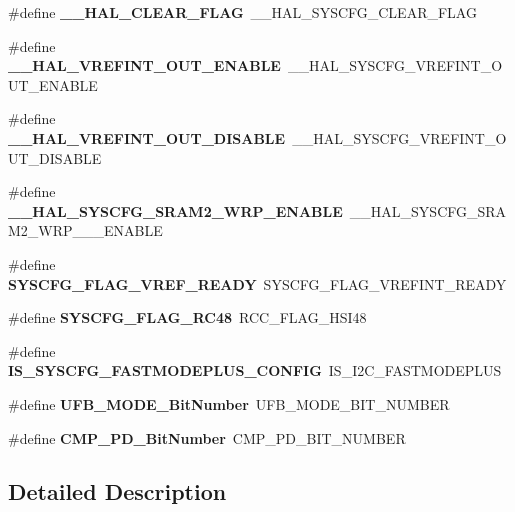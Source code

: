 \begin{DoxyCompactItemize}
\#define {\bfseries \+\_\+\+\_\+\+H\+A\+L\+\_\+\+C\+L\+E\+A\+R\+\_\+\+F\+L\+AG}~\+\_\+\+\_\+\+H\+A\+L\+\_\+\+S\+Y\+S\+C\+F\+G\+\_\+\+C\+L\+E\+A\+R\+\_\+\+F\+L\+AG
\item 
\mbox{\label{group___h_a_l___aliased___macros_gac1dfd2bab2879b5106f1dc496e3c356c}} 
\#define {\bfseries \+\_\+\+\_\+\+H\+A\+L\+\_\+\+V\+R\+E\+F\+I\+N\+T\+\_\+\+O\+U\+T\+\_\+\+E\+N\+A\+B\+LE}~\+\_\+\+\_\+\+H\+A\+L\+\_\+\+S\+Y\+S\+C\+F\+G\+\_\+\+V\+R\+E\+F\+I\+N\+T\+\_\+\+O\+U\+T\+\_\+\+E\+N\+A\+B\+LE
\item 
\mbox{\label{group___h_a_l___aliased___macros_ga8ef2904e9bea234864ed664771aeed49}} 
\#define {\bfseries \+\_\+\+\_\+\+H\+A\+L\+\_\+\+V\+R\+E\+F\+I\+N\+T\+\_\+\+O\+U\+T\+\_\+\+D\+I\+S\+A\+B\+LE}~\+\_\+\+\_\+\+H\+A\+L\+\_\+\+S\+Y\+S\+C\+F\+G\+\_\+\+V\+R\+E\+F\+I\+N\+T\+\_\+\+O\+U\+T\+\_\+\+D\+I\+S\+A\+B\+LE
\item 
\mbox{\label{group___h_a_l___aliased___macros_gacc4f47478d9502c7f9326378ddf68967}} 
\#define {\bfseries \+\_\+\+\_\+\+H\+A\+L\+\_\+\+S\+Y\+S\+C\+F\+G\+\_\+\+S\+R\+A\+M2\+\_\+\+W\+R\+P\+\_\+\+E\+N\+A\+B\+LE}~\+\_\+\+\_\+\+H\+A\+L\+\_\+\+S\+Y\+S\+C\+F\+G\+\_\+\+S\+R\+A\+M2\+\_\+\+W\+R\+P\+\_\+\_\+\_\+\+E\+N\+A\+B\+LE
\item 
\mbox{\label{group___h_a_l___aliased___macros_ga2978f132138676255e533e6f18fbe5df}} 
\#define {\bfseries S\+Y\+S\+C\+F\+G\+\_\+\+F\+L\+A\+G\+\_\+\+V\+R\+E\+F\+\_\+\+R\+E\+A\+DY}~S\+Y\+S\+C\+F\+G\+\_\+\+F\+L\+A\+G\+\_\+\+V\+R\+E\+F\+I\+N\+T\+\_\+\+R\+E\+A\+DY
\item 
\mbox{\label{group___h_a_l___aliased___macros_gaaf8b670b9f5fdd39553af1637189456c}} 
\#define {\bfseries S\+Y\+S\+C\+F\+G\+\_\+\+F\+L\+A\+G\+\_\+\+R\+C48}~R\+C\+C\+\_\+\+F\+L\+A\+G\+\_\+\+H\+S\+I48
\item 
\mbox{\label{group___h_a_l___aliased___macros_ga57549e7341a90913bac75a34768b9562}} 
\#define {\bfseries I\+S\+\_\+\+S\+Y\+S\+C\+F\+G\+\_\+\+F\+A\+S\+T\+M\+O\+D\+E\+P\+L\+U\+S\+\_\+\+C\+O\+N\+F\+IG}~I\+S\+\_\+\+I2\+C\+\_\+\+F\+A\+S\+T\+M\+O\+D\+E\+P\+L\+US
\item 
\mbox{\label{group___h_a_l___aliased___macros_gaa531b9c8535235ee73455c2b88663c03}} 
\#define {\bfseries U\+F\+B\+\_\+\+M\+O\+D\+E\+\_\+\+Bit\+Number}~U\+F\+B\+\_\+\+M\+O\+D\+E\+\_\+\+B\+I\+T\+\_\+\+N\+U\+M\+B\+ER
\item 
\mbox{\label{group___h_a_l___aliased___macros_ga0ca336e48ea4840c7d1cde05a0e07e82}} 
\#define {\bfseries C\+M\+P\+\_\+\+P\+D\+\_\+\+Bit\+Number}~C\+M\+P\+\_\+\+P\+D\+\_\+\+B\+I\+T\+\_\+\+N\+U\+M\+B\+ER
\end{DoxyCompactItemize}


\subsection{Detailed Description}
